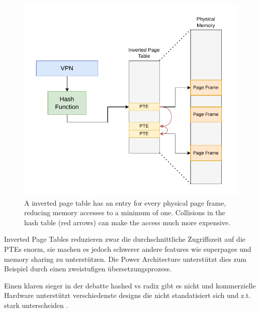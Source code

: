 \begin{figure}[t]
    \centering
    \includegraphics[scale=1]{figures/inverted_pt.pdf}
    \caption[Simple Inverted Page Table Design]{A inverted page table has an entry for every physical
        page frame, reducing memory accesses to a minimum of one. Collisions in the hash table (red arrows) can
        make the access much more expensive. }
    \label{fig:fund:inverted}
\end{figure}
Inverted Page Tables reduzieren zwar die durchschnittliche Zugriffszeit auf die PTEs enorm, sie machen
es jedoch schwerer andere features wie superpages und memory sharing zu unterstützen.
Die Power Architecture unterstützt dies zum Beispiel durch einen zweistufigen übersetzungsprozess\cite{yaniv2016hash}.





Einen klaren sieger in der debatte hashed vs radix  gibt es nicht
und kommerzielle Hardware unterstützt verschiedenste designs die nicht standatisiert sich und z.t.
stark unterscheiden \cite{jacob1998look}.

